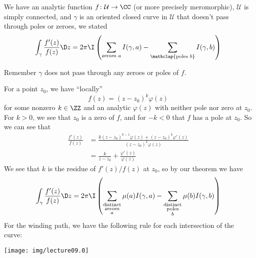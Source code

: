 We have an analytic function $f\colon\mathcal{U}\to\CC$ (or more
precisely meromorphic), $\mathcal{U}$ is simply connected, and
$\gamma$ is an oriented closed curve in $\mathcal{U}$ that
doesn't pass through poles or zeroes, we stated
\begin{equation}
\int_{\gamma}\frac{f'(z)}{f(z)}\D z=2\pi\I\left(
\sum_{{\text{zeroes }a}}I(\gamma,a)-\sum_{\mathclap{\text{poles }b}}I(\gamma,b)
\right)
\end{equation}
\begin{rmk}
Remember $\gamma$ does not pass through any zeroes or poles of $f$.
\end{rmk}
For a point $z_{0}$, we have ``locally''
\begin{equation}
f(z)=(z-z_{0})^{k}\varphi(z)
\end{equation}
for some nonzero $k\in\ZZ$ and an analytic $\varphi(z)$ with
neither pole nor zero at $z_{0}$. For $k>0$, we see that $z_{0}$ is
a zero of $f$, and for $-k<0$ that $f$ has a pole at $z_{0}$. So
we can see that
\begin{subequations}
\begin{align}
\frac{f'(z)}{f(z)} &=
\frac{k(z-z_{0})^{k-1}\varphi(z)+(z-z_{0})^{k}\varphi'(z)}{(z-z_{0})^{k}\varphi(z)}\\
&=\frac{k}{z-z_{0}}+\frac{\varphi'(z)}{\varphi(z)}
\end{align}
\end{subequations}
We see that $k$ is the residue of $f'(z)/f(z)$ at $z_{0}$, so by
our theorem we have
\begin{equation}
\int_{\gamma}\frac{f'(z)}{f(z)}\D z=2\pi\I\left(
\sum_{\substack{\text{distinct}\\\text{zeroes}\\a}}\mu(a)I(\gamma,a)
-\sum_{\substack{\text{distinct}\\\text{poles}\\b}}\mu(b)I(\gamma,b)
\right)
\end{equation}
For the winding path, we have the following rule for each intersection of
the curve:
\begin{center}
\texttt{[image: img/lecture09.0]}
\end{center}
\begin{comment}%
\begin{ex}
So for example consider
\begin{center}
\texttt{[image: img/lecture09.1]}
\end{center}
\end{ex}
\end{comment}%

